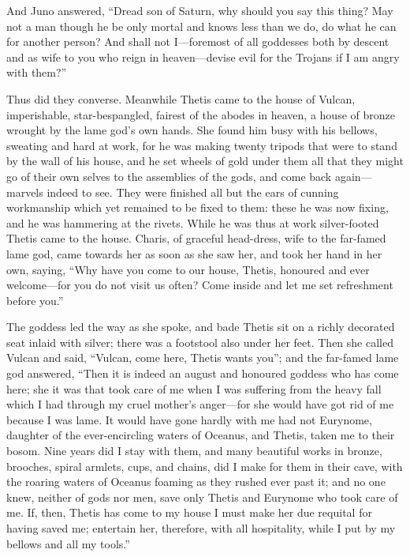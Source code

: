 And Juno answered, “Dread son of Saturn, why should you say this thing?
May not a man though he be only mortal and knows less than we do, do what
he can for another person? And shall not I—foremost of all goddesses
both by descent and as wife to you who reign in heaven—devise evil
for the Trojans if I am angry with them?”

Thus did they converse. Meanwhile Thetis came to the house of Vulcan,
imperishable, star-bespangled, fairest of the abodes in heaven, a house of
bronze wrought by the lame god’s own hands. She found him busy with his
bellows, sweating and hard at work, for he was making twenty tripods that
were to stand by the wall of his house, and he set wheels of gold under
them all that they might go of their own selves to the assemblies of the
gods, and come back again—marvels indeed to see. They were finished
all but the ears of cunning workmanship which yet remained to be fixed to
them: these he was now fixing, and he was hammering at the rivets. While
he was thus at work silver-footed Thetis came to the house. Charis, of
graceful head-dress, wife to the far-famed lame god, came towards her as
soon as she saw her, and took her hand in her own, saying, “Why have you
come to our house, Thetis, honoured and ever welcome—for you do not
visit us often? Come inside and let me set refreshment before you.”

The goddess led the way as she spoke, and bade Thetis sit on a richly
decorated seat inlaid with silver; there was a footstool also under her
feet. Then she called Vulcan and said, “Vulcan, come here, Thetis wants
you”; and the far-famed lame god answered, “Then it is indeed an august
and honoured goddess who has come here; she it was that took care of me
when I was suffering from the heavy fall which I had through my cruel
mother’s anger—for she would have got rid of me because I was lame.
It would have gone hardly with me had not Eurynome, daughter of the
ever-encircling waters of Oceanus, and Thetis, taken me to their bosom.
Nine years did I stay with them, and many beautiful works in bronze,
brooches, spiral armlets, cups, and chains, did I make for them in their
cave, with the roaring waters of Oceanus foaming as they rushed ever past
it; and no one knew, neither of gods nor men, save only Thetis and
Eurynome who took care of me. If, then, Thetis has come to my house I must
make her due requital for having saved me; entertain her, therefore, with
all hospitality, while I put by my bellows and all my tools.”

